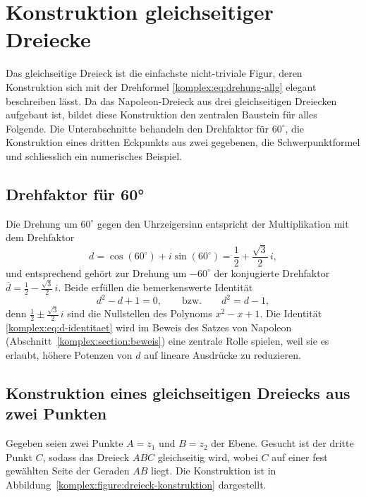 %
%
\section{Konstruktion gleichseitiger Dreiecke
\label{komplex:section:gleichseitig}}
Das gleichseitige Dreieck ist die einfachste nicht-triviale Figur,
%
deren Konstruktion sich mit der Drehformel \eqref{komplex:eq:drehung-allg}
elegant beschreiben lässt.
Da das Napoleon-Dreieck aus drei gleichseitigen Dreiecken aufgebaut ist,
bildet diese Konstruktion den zentralen Baustein für alles Folgende.
Die Unterabschnitte behandeln den Drehfaktor für $60^\circ$,
die Konstruktion eines dritten Eckpunkts aus zwei gegebenen,
die Schwerpunktformel und schliesslich ein numerisches Beispiel.

%
%
\subsection{Drehfaktor für 60°
\label{komplex:subsection:drehfaktor-60}}
Die Drehung um $60^\circ$ gegen den Uhrzeigersinn entspricht der
Multiplikation mit dem Drehfaktor
\begin{equation}
d
=
\cos(60^\circ) + i \sin(60^\circ)
=
\frac{1}{2} + \frac{\!\sqrt{3}}{2} \, i ,
\label{komplex:eq:d60}
\end{equation}
und entsprechend gehört zur Drehung um $-60^\circ$ der konjugierte
Drehfaktor $\overline{d} = \tfrac{1}{2} - \tfrac{\!\sqrt{3}}{2} \, i$.
Beide erfüllen die bemerkenswerte Identität
\begin{equation}
d^2 - d + 1 = 0 ,
\qquad
\text{bzw.}
\qquad
d^2 = d - 1 ,
\label{komplex:eq:d-identitaet}
\end{equation}
denn $\tfrac{1}{2} \pm \tfrac{\!\sqrt{3}}{2} \, i$ sind die Nullstellen des
Polynoms $x^2 - x + 1$.
Die Identität \eqref{komplex:eq:d-identitaet} wird im Beweis des Satzes
von Napoleon (Abschnitt~\ref{komplex:section:beweis}) eine zentrale Rolle
spielen, weil sie es erlaubt, höhere Potenzen von $d$ auf lineare
Ausdrücke zu reduzieren.

%
%
\subsection{Konstruktion eines gleichseitigen Dreiecks aus zwei Punkten
\label{komplex:subsection:dreieck-konstruktion}}
Gegeben seien zwei Punkte $A = z_1$ und $B = z_2$ der Ebene.
Gesucht ist der dritte Punkt $C$, sodass das Dreieck $ABC$ gleichseitig
wird, wobei $C$ auf einer fest gewählten Seite der Geraden $AB$ liegt.
Die Konstruktion ist in Abbildung~\ref{komplex:figure:dreieck-konstruktion}
dargestellt.

